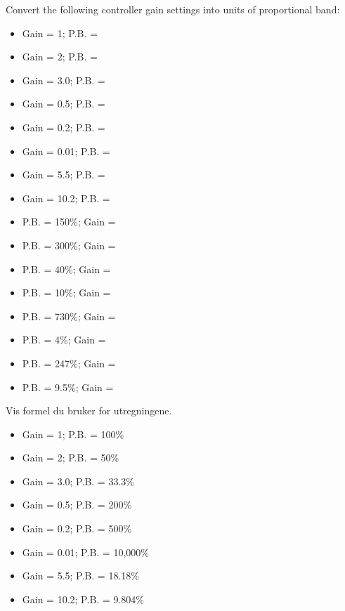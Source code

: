 Convert the following controller gain settings into units of proportional band:
\begin{multicols}{2}
\begin{itemize}
\item{}Gain = 1; P.B. = \underbar{\hskip 50pt}
\vskip 5pt
\item{}Gain = 2; P.B. = \underbar{\hskip 50pt} 
\vskip 5pt
\item{}Gain = 3.0; P.B. = \underbar{\hskip 50pt} 
\vskip 5pt
\item{}Gain = 0.5; P.B. = \underbar{\hskip 50pt}
\vskip 5pt
\item{}Gain = 0.2; P.B. = \underbar{\hskip 50pt} 
\vskip 5pt
\item{}Gain = 0.01; P.B. = \underbar{\hskip 50pt} 
\vskip 5pt
\item{}Gain = 5.5; P.B. = \underbar{\hskip 50pt} 
\vskip 5pt
\item{}Gain = 10.2; P.B. = \underbar{\hskip 50pt} 
\end{itemize} 



\begin{itemize}
\item{}P.B. = 150\%; Gain = \underbar{\hskip 50pt}
\vskip 5pt
\item{}P.B. = 300\%; Gain = \underbar{\hskip 50pt} 
\vskip 5pt
\item{}P.B. = 40\%; Gain = \underbar{\hskip 50pt} 
\vskip 5pt
\item{}P.B. = 10\%; Gain = \underbar{\hskip 50pt} 
\vskip 5pt
\item{}P.B. = 730\%; Gain = \underbar{\hskip 50pt} 
\vskip 5pt
\item{}P.B. = 4\%; Gain = \underbar{\hskip 50pt} 
\vskip 5pt
\item{}P.B. = 247\%; Gain = \underbar{\hskip 50pt} 
\vskip 5pt
\item{}P.B. = 9.5\%; Gain = \underbar{\hskip 50pt} 
\end{itemize} 
\end{multicols}

\vskip 5pt 
Vis formel du bruker for utregningene. 
\vskip 5pt 
\vfil \eject






\begin{itemize}
\item{}Gain = 1; P.B. = 100\%
\vskip 5pt
\item{}Gain = 2; P.B. = 50\%
\vskip 5pt
\item{}Gain = 3.0; P.B. = 33.3\%
\vskip 5pt
\item{}Gain = 0.5; P.B. = 200\%
\vskip 5pt
\item{}Gain = 0.2; P.B. = 500\%
\vskip 5pt
\item{}Gain = 0.01; P.B. = 10,000\%
\vskip 5pt
\item{}Gain = 5.5; P.B. = 18.18\%
\vskip 5pt
\item{}Gain = 10.2; P.B. = 9.804\%
\end{itemize} 



